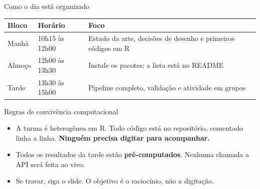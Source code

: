 \documentclass[11pt,aspectratio=169]{beamer}
\begin{document}
\begin{frame}{Como o dia está organizado}
\begin{table}
\small
\begin{tabular}{p{1.6cm}p{3.4cm}p{7.6cm}}
\toprule
\textbf{Bloco} & \textbf{Horário} & \textbf{Foco} \\
\midrule
Manhã & 10h15 às 12h00 & Estado da arte, decisões de desenho e primeiros
códigos em R \\
Almoço & 12h00 às 13h30 & Instale os pacotes; a lista está no README \\
Tarde & 13h30 às 15h00 & Pipeline completo, validação e atividade em grupos \\
\bottomrule
\end{tabular}
\end{table}
\vspace{0.15cm}
\begin{block}{Regras de convivência computacional}
\footnotesize
\begin{itemize}
  \item A turma é heterogênea em R. Todo código está no repositório, comentado
        linha a linha. \textbf{Ninguém precisa digitar para acompanhar.}
  \item Todos os resultados da tarde estão \textbf{pré-computados}. Nenhuma
        chamada a API será feita ao vivo.
  \item Se travar, siga o slide. O objetivo é o raciocínio, não a digitação.
\end{itemize}
\end{block}
\end{frame}
\end{document}
